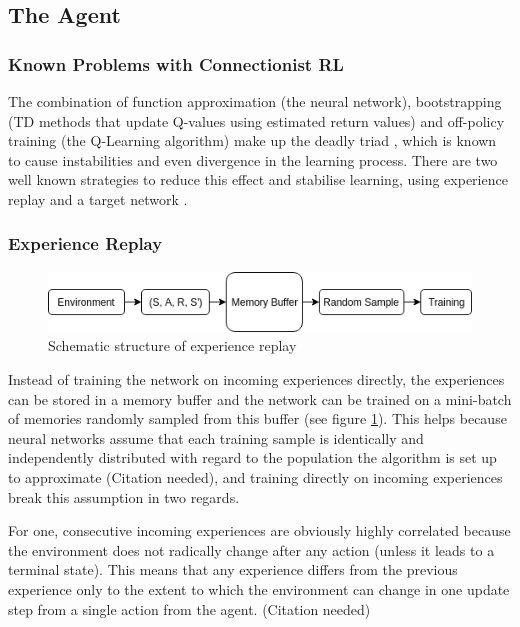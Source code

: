 \subsection{The Agent}\label{sec:agent}


\subsubsection{Known Problems with Connectionist RL}\label{sec:problems}
The combination of function approximation (the neural network), bootstrapping (TD methods that update Q-values using estimated return values) and off-policy training (the Q-Learning algorithm) make up the deadly triad \citep{sutton_barto_2018}, which is known to cause instabilities and even divergence in the learning process. There are two well known strategies to reduce this effect and stabilise learning, using experience replay and a target network \citep{mnih2015human}.

\subsubsection{Experience Replay}\label{sec:exp_replay}

\begin{figure}[h]
    \centering
    \includegraphics[width=1\linewidth]{img/Experience_Replay.png}
    \caption{Schematic structure of experience replay}
    \label{fig:expreplay}
\end{figure}

Instead of training the network on incoming experiences directly, the experiences can be stored in a memory buffer and the network can be trained on a mini-batch of memories randomly sampled from this buffer (see figure \ref{fig:expreplay}). This helps because neural networks assume that each training sample is identically and independently distributed with regard to the population the algorithm is set up to approximate (Citation needed), and training directly on incoming experiences break this assumption in two regards.

For one, consecutive incoming experiences are obviously highly correlated because the environment does not radically change after any action (unless it leads to a terminal state). This means that any experience differs from the previous experience only to the extent to which the environment can change in one update step from a single action from the agent. (Citation needed)

